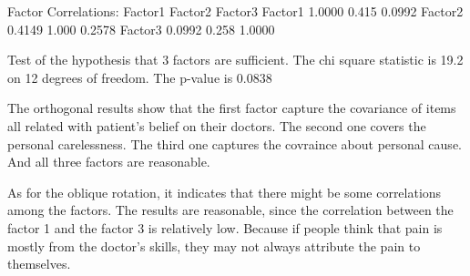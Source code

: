 \documentclass[
]{article}
\newenvironment{Shaded}{\begin{snugshade}}{\end{snugshade}}
\newcommand{\DecValTok}[1]{\textcolor[rgb]{0.00,0.00,0.81}{#1}}
\newcommand{\FloatTok}[1]{\textcolor[rgb]{0.00,0.00,0.81}{#1}}
\newcommand{\NormalTok}[1]{#1}
\newcommand{\SpecialCharTok}[1]{\textcolor[rgb]{0.00,0.00,0.00}{#1}}
\begin{document}
\begin{Shaded}
\begin{Highlighting}[]
\NormalTok{Factor Correlations}\SpecialCharTok{:}
\NormalTok{        Factor1 Factor2 Factor3}
\NormalTok{Factor1  }\FloatTok{1.0000}   \FloatTok{0.415}  \FloatTok{0.0992}
\NormalTok{Factor2  }\FloatTok{0.4149}   \FloatTok{1.000}  \FloatTok{0.2578}
\NormalTok{Factor3  }\FloatTok{0.0992}   \FloatTok{0.258}  \FloatTok{1.0000}

\NormalTok{Test of the hypothesis that }\DecValTok{3}\NormalTok{ factors are sufficient.}
\NormalTok{The chi square statistic is }\FloatTok{19.2}\NormalTok{ on }\DecValTok{12}\NormalTok{ degrees of freedom.}
\NormalTok{The p}\SpecialCharTok{{-}}\NormalTok{value is }\FloatTok{0.0838} 
\end{Highlighting}
\end{Shaded}

The orthogonal results show that the first factor capture the covariance
of items all related with patient's belief on their doctors. The second
one covers the personal carelessness. The third one captures the
covraince about personal cause. And all three factors are reasonable.

As for the oblique rotation, it indicates that there might be some
correlations among the factors. The results are reasonable, since the
correlation between the factor 1 and the factor 3 is relatively low.
Because if people think that pain is mostly from the doctor's skills,
they may not always attribute the pain to themselves.
\end{document}
